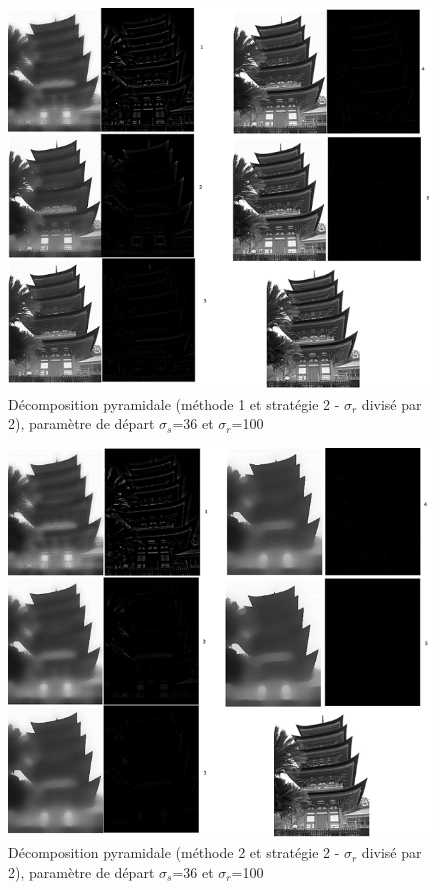 \documentclass[twoside,UTF8]{EPURapport}
\begin{document}
\begin{figure}[H]
	\begin{center} 
		\includegraphics[]{images/pyramide1_rdiv2__36_100_IM088.png} 
	\end{center} 
	\caption{Décomposition pyramidale (méthode 1 et stratégie 2 - $\sigma_r$ divisé par 2), paramètre de départ $\sigma_s$=36 et $\sigma_r$=100}
\end{figure} 

\begin{figure}[H]
	\begin{center} 
		\includegraphics[]{images/pyramide2_rdiv2__36_100_IM088.png} 
	\end{center} 
	\caption{Décomposition pyramidale (méthode 2 et stratégie 2 - $\sigma_r$ divisé par 2), paramètre de départ $\sigma_s$=36 et $\sigma_r$=100}
\end{figure}
\end{document}
